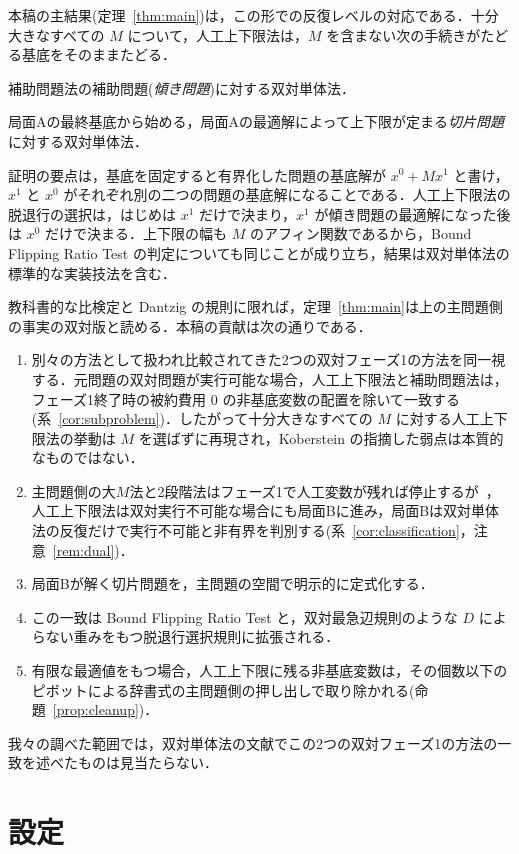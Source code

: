 \documentclass[11pt,a4paper]{ltjsarticle}
\theoremstyle{plain}
\theoremstyle{definition}
\theoremstyle{remark}
\begin{document}
本稿の主結果(定理~\ref{thm:main})は，この形での反復レベルの対応である．十分大きなすべての $M$ について，人工上下限法は，$M$ を含まない次の手続きがたどる基底をそのままたどる．
\begin{description}[leftmargin=1em]
\item[局面A：] 補助問題法の補助問題(\emph{傾き問題})に対する双対単体法．
\item[局面B：] 局面Aの最終基底から始める，局面Aの最適解によって上下限が定まる\emph{切片問題}に対する双対単体法．
\end{description}
証明の要点は，基底を固定すると有界化した問題の基底解が $x^0+Mx^1$ と書け，$x^1$ と $x^0$ がそれぞれ別の二つの問題の基底解になることである．人工上下限法の脱退行の選択は，はじめは $x^1$ だけで決まり，$x^1$ が傾き問題の最適解になった後は $x^0$ だけで決まる．上下限の幅も $M$ のアフィン関数であるから，Bound Flipping Ratio Test の判定についても同じことが成り立ち，結果は双対単体法の標準的な実装技法を含む．

教科書的な比検定と Dantzig の規則に限れば，定理~\ref{thm:main}は上の主問題側の事実の双対版と読める．本稿の貢献は次の通りである．
\begin{enumerate}[label=(\roman*)]
\item 別々の方法として扱われ比較されてきた2つの双対フェーズ1の方法を同一視する．元問題の双対問題が実行可能な場合，人工上下限法と補助問題法は，フェーズ1終了時の被約費用 $0$ の非基底変数の配置を除いて一致する(系~\ref{cor:subproblem})．したがって十分大きなすべての $M$ に対する人工上下限法の挙動は $M$ を選ばずに再現され，Koberstein の指摘した弱点は本質的なものではない．
\item 主問題側の大$M$法と2段階法はフェーズ1で人工変数が残れば停止するが~\cite[4.3節]{bazaraa2010}，人工上下限法は双対実行不可能な場合にも局面Bに進み，局面Bは双対単体法の反復だけで実行不可能と非有界を判別する(系~\ref{cor:classification}，注意~\ref{rem:dual})．
\item 局面Bが解く切片問題を，主問題の空間で明示的に定式化する．
\item この一致は Bound Flipping Ratio Test と，双対最急辺規則のような $D$ によらない重みをもつ脱退行選択規則に拡張される．
\item 有限な最適値をもつ場合，人工上下限に残る非基底変数は，その個数以下のピボットによる辞書式の主問題側の押し出しで取り除かれる(命題~\ref{prop:cleanup})．
\end{enumerate}
我々の調べた範囲では，双対単体法の文献でこの2つの双対フェーズ1の方法の一致を述べたものは見当たらない．

\section{設定}
\label{sec:setting}
\end{document}
